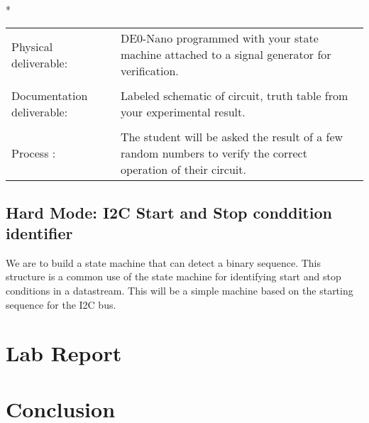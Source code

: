   \vspace{15px}
  \begin{centering}
    \begin{fminipage}{.43\textwidth}
      \vspace{3px}
      \\*
      \vspace{10px}
      \begin{tabular}{p{1.8cm}  p{5.4cm}}
        \raggedright Physical deliverable:                         &DE0-Nano programmed with your state machine attached to a signal generator for verification.\\
        \\
        \raggedright Documentation deliverable:          & Labeled schematic of circuit,  truth table from your  experimental result.\\
        \\
        Process :                                                                            &The student will be asked the result of a few random numbers to verify the correct operation of their circuit.
      \end{tabular}
    \end{fminipage}
  \end{centering} 

  \subsection{Hard Mode: I2C Start and Stop conddition identifier}
    We are to build a state machine that can detect a binary sequence. This structure is a common use of the state machine for identifying start and stop conditions in a datastream. This will be a simple machine based on the starting sequence for the I2C bus.
\section{ Lab Report}
  

\section{ Conclusion}
 

